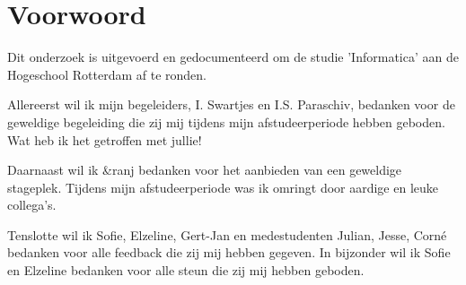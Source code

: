 \chapter*{Voorwoord}
Dit onderzoek is uitgevoerd en gedocumenteerd om de studie 'Informatica' aan de Hogeschool Rotterdam af te ronden.

\vspace{5mm}

\noindent
Allereerst wil ik mijn begeleiders, I. Swartjes en I.S. Paraschiv, bedanken voor de geweldige begeleiding die zij mij tijdens mijn afstudeerperiode hebben geboden. Wat heb ik het getroffen met jullie!

\vspace{5mm}

\noindent
Daarnaast wil ik \&ranj bedanken voor het aanbieden van een geweldige stageplek. Tijdens mijn afstudeerperiode was ik omringt door aardige en leuke collega's.

\vspace{5mm}

\noindent
Tenslotte wil ik Sofie, Elzeline, Gert-Jan en medestudenten Julian, Jesse, Corné bedanken voor alle feedback die zij mij hebben gegeven. In bijzonder wil ik Sofie en Elzeline bedanken voor alle steun die zij mij hebben geboden.